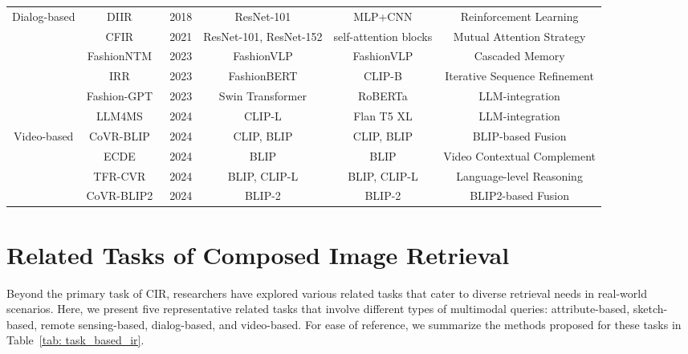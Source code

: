 \begin{table*}
\begin{tabular}{|c|c|c|c|c|c|}
    \hline

    \multirow{5}{*}{Dialog-based} 
    & DIIR~\cite{guo2018dialog} & 2018 & ResNet-101 & MLP+CNN & Reinforcement Learning\\
     \cline{2-6}
    & CFIR~\cite{cfir2021} & 2021 & ResNet-101, ResNet-152 & self-attention blocks & Mutual Attention Strategy \\
    \cline{2-6}
    & FashionNTM~\cite{fashionntm} & 2023 & FashionVLP & FashionVLP & Cascaded Memory\\  
    \cline{2-6}
    & IRR~\cite{irr} & 2023 & FashionBERT& CLIP-B & Iterative Sequence Refinement\\ 
    \cline{2-6}
     & Fashion-GPT~\cite{fashiongpt} & 2023 & Swin Transformer& RoBERTa& LLM-integration\\
     \cline{2-6}
    & LLM4MS~\cite{llm4ms} & 2024 & CLIP-L & Flan T5 XL & LLM-integration\\
    
    \hline
    
    \multirow{4}{*}{Video-based} 
    & CoVR-BLIP~\cite{Covr} & 2024 & CLIP, BLIP & CLIP, BLIP & BLIP-based Fusion\\
    \cline{2-6}
    & ECDE~\cite{ecde} & 2024 & BLIP & BLIP & Video Contextual Complement  \\
    \cline{2-6}
    & TFR-CVR~\cite{tfrcvr} & 2024 & BLIP, CLIP-L & BLIP, CLIP-L & Language-level Reasoning \\
    \cline{2-6}
    & CoVR-BLIP2~\cite{CoVR2} & 2024 & BLIP-2 & BLIP-2 & BLIP2-based Fusion\\ 
    
    \hline
    \end{tabular}
\end{table*}

\section{Related Tasks of Composed Image Retrieval}
Beyond the primary task of CIR, researchers have explored various related tasks that cater to diverse retrieval needs in real-world scenarios. Here, we present five representative related tasks that involve different types of multimodal queries: attribute-based, sketch-based, remote sensing-based, dialog-based, and video-based. For ease of reference, we summarize the methods proposed for  these tasks in Table~\ref{tab: task_based_ir}. 

